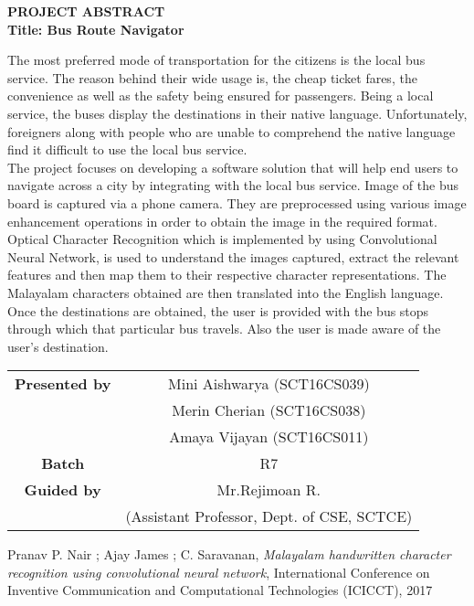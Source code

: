 \documentclass[a4 paper, 12pt]{article}
\begin{document}
\begin{center}
\Large{\textbf{PROJECT ABSTRACT}}
\\
\textbf{Title: Bus Route Navigator}
\end{center}
\begin{flushleft}
The most preferred mode of transportation for the citizens is the local bus service. The reason behind their wide usage is, the cheap ticket fares, the convenience as well as the safety being ensured for passengers. Being a local service, the buses display the destinations in their native language. Unfortunately, foreigners along with people who are unable to comprehend the native language find it difficult to use the local bus service.
\\
\vspace{6pt}
The project focuses on developing a software solution that will help end users to navigate across a city by integrating with the local bus service. Image of the bus board is captured via a phone camera. They are preprocessed using various image enhancement operations in order to obtain the image in the required format. Optical Character Recognition which is implemented by using Convolutional Neural Network, is used to understand the images captured, extract the relevant features and then map them to their respective character representations. The Malayalam characters obtained are then translated into the English language. Once the destinations are obtained, the user is provided with the bus stops through which that particular bus travels. Also the user is made aware of the user’s destination.  
\end{flushleft}

\begin{flushleft}
\vspace{1pt}
\begin{tabular}{|c|c|}
\hline
\textbf{Presented by} \hspace{70pt} & Mini Aishwarya (SCT16CS039) \\ & Merin Cherian (SCT16CS038) \\ & Amaya Vijayan (SCT16CS011) \\
\hline
\textbf{Batch} \hspace{70pt} & R7 \\
\hline
\textbf{Guided by} \hspace{70pt} & Mr.Rejimoan R. \\
 & (Assistant Professor, Dept. of CSE, SCTCE) \\
\hline
\end{tabular}
\end{flushleft}

\begin{flushleft}
\begin{thebibliography}{2}

Pranav P. Nair ; Ajay James ; C. Saravanan, \textit{Malayalam handwritten character recognition using convolutional neural network}, International Conference on Inventive Communication and Computational Technologies (ICICCT), 2017

\end{thebibliography}
\end{flushleft}
\end{document}
